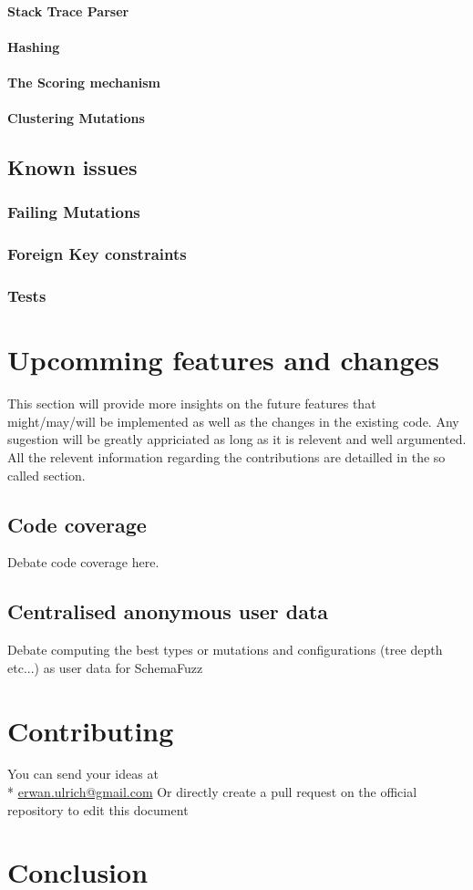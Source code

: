 \documentclass{article}
\begin{document}
				\paragraph{Stack Trace Parser}
				\paragraph{Hashing}
				\paragraph{The Scoring mechanism}
				\paragraph{Clustering Mutations}
		\subsection{Known issues}		
			\subsubsection{Failing Mutations}
			\subsubsection{Foreign Key constraints}
			\subsubsection{Tests}
	\section{Upcomming features and changes}
This section will provide more insights on the future features that might/may/will be implemented as well as the changes in the existing code.
Any sugestion will be greatly appriciated as long as it is relevent and well argumented. All the relevent information regarding the contributions are detailled in the so called section.
	
		\subsection{Code coverage}
Debate code coverage here.
		\subsection{Centralised anonymous user data}
Debate computing the best types or mutations and configurations (tree depth etc...) as user data for SchemaFuzz
		
	\section{Contributing}
You can send your ideas at  \\*
		\url{erwan.ulrich@gmail.com}
Or directly create a pull request on the official repository to edit this document
	\section{Conclusion}
\end{document}

